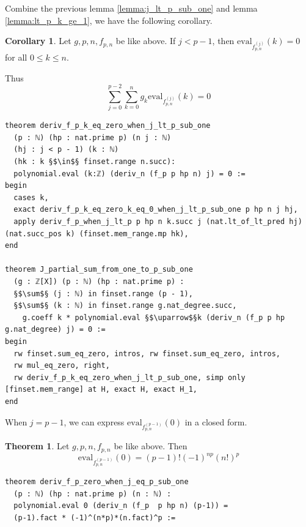 \documentclass{report}
\theoremstyle{definition}
\newtheorem{theorem}{Theorem}[section]
\newtheorem{corollary}{Corollary}[section]
\begin{document}
Combine the previous lemma \ref{lemma:j_lt_p_sub_one} and lemma \ref{lemma:lt_p_k_ge_1}, we have the following corollary.
\begin{corollary}\label{cor:part1}
Let $g,p,n,f_{p,n}$ be like above. If $j < p-1$, then $\mathrm{eval}_{f_{p,n}^{(j)}}(k) = 0$ for all $0\le k\le n$.

Thus
$$
\sum_{j=0}^{p-2}\sum_{k=0}^n g_k\mathrm{eval}_{f_{p,n}^{(j)}}(k)=0
$$
\begin{verbatim}
theorem deriv_f_p_k_eq_zero_when_j_lt_p_sub_one 
  (p : ℕ) (hp : nat.prime p) (n j : ℕ) 
  (hj : j < p - 1) (k : ℕ) 
  (hk : k §$\in$§ finset.range n.succ): 
  polynomial.eval (k:ℤ) (deriv_n (f_p p hp n) j) = 0 :=
begin
  cases k, 
  exact deriv_f_p_k_eq_zero_k_eq_0_when_j_lt_p_sub_one p hp n j hj,
  apply deriv_f_p_when_j_lt_p p hp n k.succ j (nat.lt_of_lt_pred hj) (nat.succ_pos k) (finset.mem_range.mp hk),
end

theorem J_partial_sum_from_one_to_p_sub_one 
  (g : ℤ[X]) (p : ℕ) (hp : nat.prime p) : 
  §$\sum$§ (j : ℕ) in finset.range (p - 1),
  §$\sum$§ (k : ℕ) in finset.range g.nat_degree.succ,
    g.coeff k * polynomial.eval §$\uparrow$§k (deriv_n (f_p p hp g.nat_degree) j) = 0 :=
begin
  rw finset.sum_eq_zero, intros, rw finset.sum_eq_zero, intros,
  rw mul_eq_zero, right, 
  rw deriv_f_p_k_eq_zero_when_j_lt_p_sub_one, simp only [finset.mem_range] at H, exact H, exact H_1,
end
\end{verbatim}
\end{corollary}

When $j=p-1$, we can express $\mathrm{eval}_{f_{p,n}^{(p-1)}}(0)$ in a closed form.
\begin{theorem}\label{thm:f_p_psub1_deriv_0}
Let $g,p,n,f_{p,n}$ be like above. Then 
$$\mathrm{eval}_{f_{p,n}^{(p-1)}}(0)=(p-1)!(-1)^{np}(n!)^p$$
\begin{verbatim}
theorem deriv_f_p_zero_when_j_eq_p_sub_one 
  (p : ℕ) (hp : nat.prime p) (n : ℕ) : 
  polynomial.eval 0 (deriv_n (f_p  p hp n) (p-1)) = 
  (p-1).fact * (-1)^(n*p)*(n.fact)^p :=
\end{verbatim}
\end{theorem}
\end{document}
